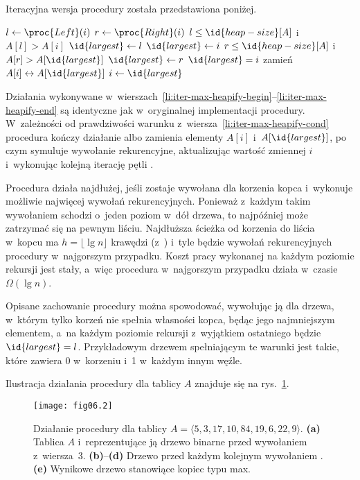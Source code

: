 \exercise %
Iteracyjna wersja procedury  została przedstawiona poniżej.
\begin{codebox}
\li	\While {}
\li		\Do
			$l\gets\proc{Left}(i)$ \label{li:iter-max-heapify-begin}
\li			$r\gets\proc{Right}(i)$
\li			\If $l\le\id{heap-size}[A]$ i~$A[l]>A[i]$
\li				\Then $\id{largest}\gets l$
\li				\Else $\id{largest}\gets i$
				\End
\li			\If $r\le\id{heap-size}[A]$ i~$A[r]>A[\id{largest}]$
\li				\Then $\id{largest}\gets r$
				\End \label{li:iter-max-heapify-end}
\li			\If $\id{largest}=i$ \label{li:iter-max-heapify-cond}
\li				\Then \Return
				\End
\li			zamień $A[i]\leftrightarrow A[\id{largest}]$
\li			$i\gets\id{largest}$
		\End
\end{codebox}
Działania wykonywane w~wierszach~\ref{li:iter-max-heapify-begin}--\ref{li:iter-max-heapify-end} są identyczne jak w~oryginalnej implementacji procedury. W~zależności od prawdziwości warunku z~wiersza~\ref{li:iter-max-heapify-cond} procedura kończy działanie albo zamienia elementy $A[i]$ i~$A[\id{largest}]$, po czym symuluje wywołanie rekurencyjne, aktualizując wartość zmiennej $i$ i~wykonując kolejną iterację pętli .

\exercise %
Procedura  działa najdłużej, jeśli zostaje wywołana dla korzenia kopca i~wykonuje możliwie najwięcej wywołań rekurencyjnych. Ponieważ z~każdym takim wywołaniem schodzi o~jeden poziom w~dół drzewa, to najpóźniej może zatrzymać się na pewnym liściu. Najdłuższa ścieżka od korzenia do liścia w~kopcu ma $h=\lfloor\lg n\rfloor$ krawędzi (z~) i~tyle będzie wywołań rekurencyjnych procedury w~najgorszym przypadku. Koszt pracy wykonanej na każdym poziomie rekursji jest stały, a~więc procedura  w~najgorszym przypadku działa w~czasie $\Omega(\lg n)$.

Opisane zachowanie procedury można spowodować, wywołując ją dla drzewa, w~którym tylko korzeń nie spełnia własności kopca, będąc jego najmniejszym elementem, a~na każdym poziomie rekursji z~wyjątkiem ostatniego będzie $\id{largest}=l$. Przykładowym drzewem spełniającym te warunki jest takie, które zawiera 0 w~korzeniu i~1 w~każdym innym węźle.


\exercise %
Ilustracja działania procedury  dla tablicy $A$ znajduje się na rys.~\ref{fig:6.3-1}.
\begin{figure}[ht!]
	\begin{center}
		\texttt{[image: fig06.2]}
	\end{center}
	\caption{Działanie procedury  dla tablicy $A=\langle5,3,17,10,84,19,6,22,9\rangle$. {\sffamily\bfseries(a)} Tablica $A$ i~reprezentujące ją drzewo binarne przed wywołaniem  z~wiersza~3. {\sffamily\bfseries(b)}--{\sffamily\bfseries(d)} Drzewo przed każdym kolejnym wywołaniem . {\sffamily\bfseries(e)} Wynikowe drzewo stanowiące kopiec typu max.} \label{fig:6.3-1}
\end{figure}

